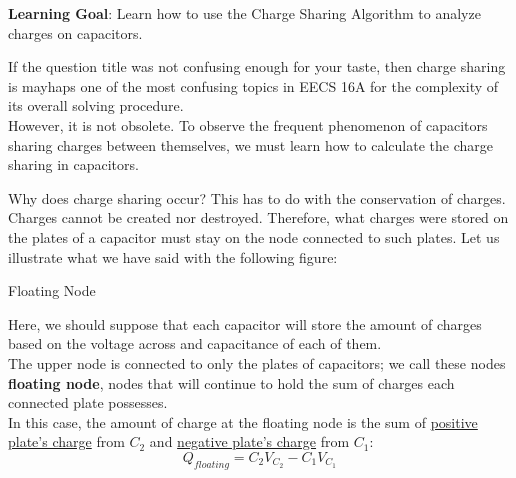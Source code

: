 

\textbf{Learning Goal}: Learn how to use the Charge Sharing Algorithm to analyze charges on capacitors. \\

If the question title was not confusing enough for your taste, then charge sharing is mayhaps one of the most confusing topics in EECS 16A for the complexity of its overall solving procedure. \\
However, it is not obsolete. To observe the frequent phenomenon of capacitors sharing charges between themselves, we must learn how to calculate the charge sharing in capacitors.

Why does charge sharing occur? This has to do with the conservation of charges. \\
Charges cannot be created nor destroyed. Therefore, what charges were stored on the plates of a capacitor must stay on the node connected to such plates. Let us illustrate what we have said with the following figure:
\begin{ln-fig}{Floating Node}{}
    \begin{center}
        
    \end{center}
    \tcblower
    Here, we should suppose that each capacitor will store the amount of charges based on the voltage across and capacitance of each of them. \\
    The upper node is connected to only the plates of capacitors; we call these nodes \textbf{floating node}, nodes that will continue to hold the sum of charges each connected plate possesses. \\
    In this case, the amount of charge at the floating node is the sum of \underline{positive plate's charge} from $C_2$ and \underline{negative plate's charge} from $C_1$:
    \[Q_{floating} = C_2 V_{C_2} - C_1 V_{C_1}\]
\end{ln-fig}

